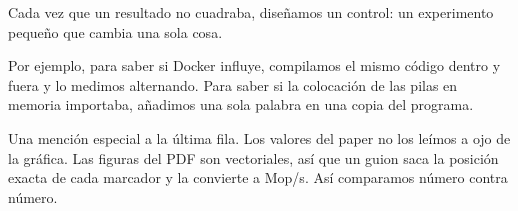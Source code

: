 Cada vez que un resultado no cuadraba, diseñamos un control: un experimento pequeño que cambia una sola cosa.

Por ejemplo, para saber si Docker influye, compilamos el mismo código dentro y fuera y lo medimos alternando. Para saber si la colocación de las pilas en memoria importaba, añadimos una sola palabra en una copia del programa.

Una mención especial a la última fila. Los valores del paper no los leímos a ojo de la gráfica. Las figuras del PDF son vectoriales, así que un guion saca la posición exacta de cada marcador y la convierte a Mop/s. Así comparamos número contra número.
